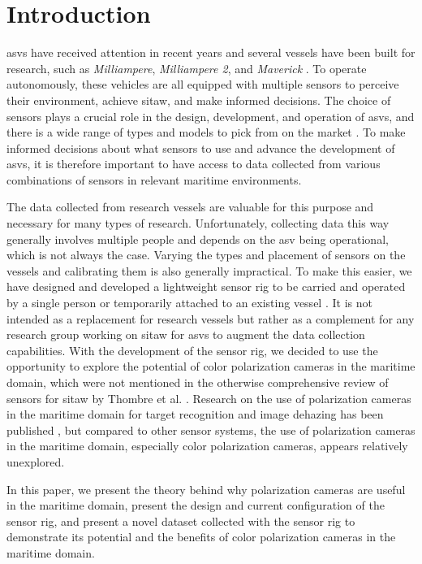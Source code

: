\section{Introduction}
\glspl{asv} have received attention in recent years and several vessels have been built for research, such as \textit{Milliampere}, \textit{Milliampere 2}, and \textit{Maverick} \cite{brekkeMilliAmpereAutonomousFerry2022}\cite{zhangDesignBuildAutonomous2023}\cite{eideAutonomousUrbanPassenger2024}.
To operate autonomously, these vehicles are all equipped with multiple sensors to perceive their environment, achieve \gls{sitaw}, and make informed decisions.
The choice of sensors plays a crucial role in the design, development, and operation of \glspl{asv}, and there is a wide range of types and models to pick from on the market \cite{thombreSensorsAITechniques2022}.
To make informed decisions about what sensors to use and advance the development of \glspl{asv}, it is therefore important to have access to data collected from various combinations of sensors in relevant maritime environments.

The data collected from research vessels are valuable for this purpose and necessary for many types of research.
Unfortunately, collecting data this way generally involves multiple people and depends on the \gls{asv} being operational, which is not always the case.
Varying the types and placement of sensors on the vessels and calibrating them is also generally impractical.
To make this easier, we have designed and developed a lightweight sensor rig to be carried and operated by a single person or temporarily attached to an existing vessel \cite{martensPavingWayEnhanced2023}.
It is not intended as a replacement for research vessels but rather as a complement for any research group working on \gls{sitaw} for \glspl{asv} to augment the data collection capabilities.
With the development of the sensor rig, we decided to use the opportunity to explore the potential of color polarization cameras in the maritime domain, which were not mentioned in the otherwise comprehensive review of sensors for \gls{sitaw} by Thombre et al. \cite{thombreSensorsAITechniques2022}.
Research on the use of polarization cameras in the maritime domain for target recognition and image dehazing has been published \cite{zhongPolarizationintensityJointImaging2023}\cite{maPolarizationBasedMethodMaritime2024}, but compared to other sensor systems, the use of polarization cameras in the maritime domain, especially color polarization cameras, appears relatively unexplored.

In this paper, we present the theory behind why polarization cameras are useful in the maritime domain, present the design and current configuration of the sensor rig, and present a novel dataset collected with the sensor rig to demonstrate its potential and the benefits of color polarization cameras in the maritime domain.

